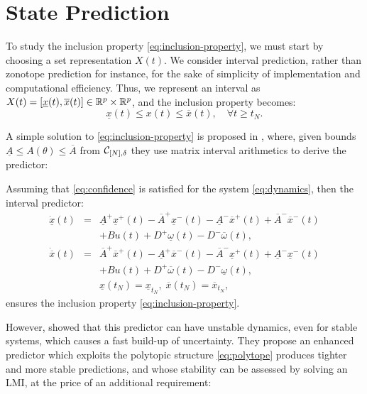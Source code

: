 \documentclass{article}
\begin{document}
\section{State Prediction}

\label{sec:prediction}

To study the inclusion property \eqref{eq:inclusion-property}, we must start by choosing a set representation $X(t)$. We consider interval prediction, rather than zonotope prediction for instance, for the sake of simplicity of implementation and computational efficiency. Thus, we represent an interval as $X(t) = [\underline{x}(t), \overline{x}(t)]\in \mathbb{R}^p\times \mathbb{R}^p$, and the inclusion property becomes:
\begin{equation}
\label{eq:inclusion-property}
\underline{x}(t)\leq x(t)\leq\overline{x}(t),\quad\forall t\geq t_N.
\end{equation} 

A simple solution to \eqref{eq:inclusion-property} is proposed in \citep{efimov:hal-00701643}, where, given bounds $\underline{A}\leq A(\theta)\leq\overline{A}$ from $\mathcal{C}_{[N],\delta}$ they use matrix interval arithmetics to derive the predictor:
\begin{proposition}
Assuming that \eqref{eq:confidence} is satisfied for the system \eqref{eq:dynamics}, then the interval predictor:
\begin{eqnarray}
\dot{\underline{x}}(t) & = & \underline{A}^{+}\underline{x}^{+}(t)-\overline{A}^{+}\underline{x}^{-}(t)-\underline{A}^{-}\overline{x}^{+}(t) +\overline{A}^{-}\overline{x}^{-}(t)\nonumber \\
 &  &+Bu(t) + D^{+}\underline{\omega}(t)-D^{-}\overline{\omega}(t),\label{eq:predictor-naive}\\
\dot{\overline{x}}(t) & = & \overline{A}^{+}\overline{x}^{+}(t)-\underline{A}^{+}\overline{x}^{-}(t)-\overline{A}^{-}\underline{x}^{+}(t)+\underline{A}^{-}\underline{x}^{-}(t)\nonumber \\
 &  &+Bu(t) + D^{+}\overline{\omega}(t)-D^{-}\underline{\omega}(t),\nonumber \\
 &  & \underline{x}(t_N)=\underline{x}_{t_N},\;\overline{x}(t_N)=\overline{x}_{t_N},\nonumber 
\end{eqnarray}
ensures the inclusion property \eqref{eq:inclusion-property}.
\end{proposition}

However, \citet{leurent2019interval} showed that this predictor can have unstable dynamics, even for stable systems, which causes a fast build-up of uncertainty. They propose an enhanced predictor which exploits the polytopic structure \eqref{eq:polytope} produces tighter and more stable predictions, and whose stability can be assessed by solving an LMI, at the price of an additional requirement:
\end{document}
